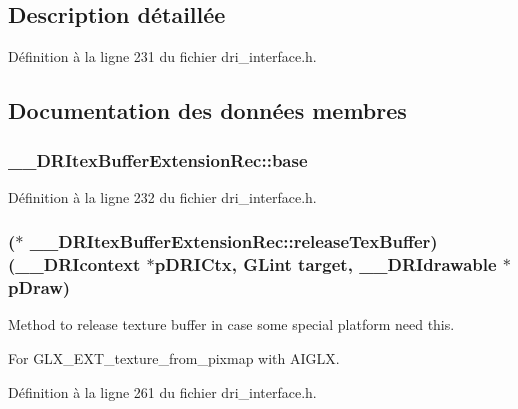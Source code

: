 \subsection{Description détaillée}


Définition à la ligne 231 du fichier dri\-\_\-interface.\-h.



\subsection{Documentation des données membres}
\hypertarget{struct_____d_r_itex_buffer_extension_rec_a979ee2a12e9e249c0fb492f7308d19a4}{
\subsubsection[{base}]{ \-\_\-\-\_\-\-D\-R\-Itex\-Buffer\-Extension\-Rec\-::base}}\label{struct_____d_r_itex_buffer_extension_rec_a979ee2a12e9e249c0fb492f7308d19a4}


Définition à la ligne 232 du fichier dri\-\_\-interface.\-h.

\hypertarget{struct_____d_r_itex_buffer_extension_rec_a85e0f071a5f3befdc831bfda50e7abcb}{
\subsubsection[{release\-Tex\-Buffer}]{($\ast$ \-\_\-\-\_\-\-D\-R\-Itex\-Buffer\-Extension\-Rec\-::release\-Tex\-Buffer)({\bf \-\_\-\-\_\-\-D\-R\-Icontext} $\ast$p\-D\-R\-I\-Ctx, {\bf G\-Lint} {\bf target}, {\bf \-\_\-\-\_\-\-D\-R\-Idrawable} $\ast$p\-Draw)}}\label{struct_____d_r_itex_buffer_extension_rec_a85e0f071a5f3befdc831bfda50e7abcb}
Method to release texture buffer in case some special platform need this.

For G\-L\-X\-\_\-\-E\-X\-T\-\_\-texture\-\_\-from\-\_\-pixmap with A\-I\-G\-L\-X. 

Définition à la ligne 261 du fichier dri\-\_\-interface.\-h.

